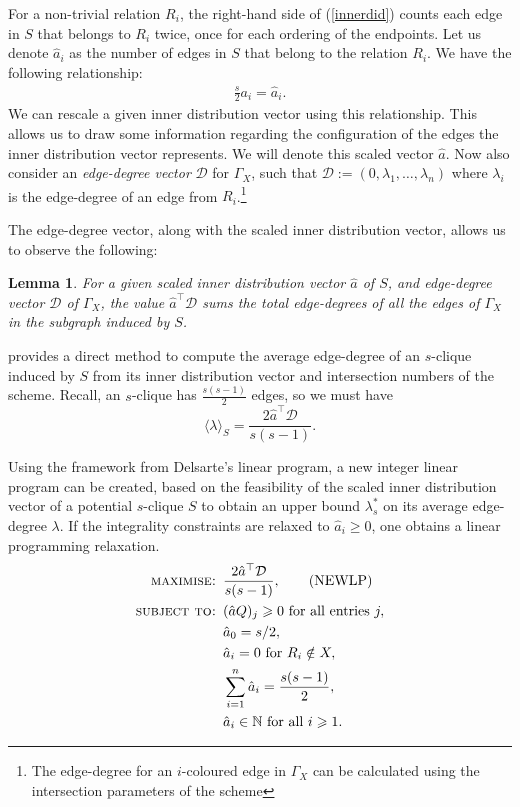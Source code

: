 \documentclass[11pt, baustms]{amsproc}
\theoremstyle{scplain}
\newtheorem{lemma}[theorem]{Lemma}
\renewcommand\ge{\geqslant}
\begin{document}
    For a non-trivial relation $R_i$, the right-hand side of (\ref{innerdid}) counts each edge in $S$ that belongs to $R_i$ twice, once for each ordering of the endpoints. Let us denote $\hat{a}_i$ as the number of edges in $S$ that belong to the relation $R_i$. We have the following relationship: \begin{align} \frac{s}{2} a_i = \hat{a}_i. \label{edgeconfig} \end{align} We can rescale a given inner distribution vector using this relationship. This allows us to draw some information regarding the configuration of the edges the inner distribution vector represents. We will denote this scaled vector $\hat{a}$. Now also consider an \textit{edge-degree vector} $\mathcal{D}$ for $\Gamma_X$,  such that $\mathcal{D} := (0, \lambda_1, \dots, \lambda_n)$ where $\lambda_i$ is the edge-degree of an edge from $R_i$.\footnote{The edge-degree for an $i$-coloured edge in $\Gamma_X$ can be calculated using the intersection parameters of the scheme}

    The edge-degree vector, along with the scaled inner distribution vector, allows us to observe the following:
	\begin{lemma}
		\label{eds}
		For a given scaled inner distribution vector $\hat{a}$ of $S$, and edge-degree vector $\mathcal{D}$ of $ \Gamma_X$, the value $\hat{a}^\top \mathcal{D}$ sums the total edge-degrees of all the edges of $\Gamma_X$ in the subgraph induced by $S$.
	\end{lemma}

	 provides a direct method to compute the average edge-degree of an $s$-clique induced by $S$ from its inner distribution vector and intersection numbers of the scheme. Recall, an $s$-clique has $\frac{s(s-1)}{2}$ edges, so we must have $$\langle \lambda \rangle_S = \frac{2 \hat{a}^\top \mathcal{D}}{s(s-1)}.$$ 


Using the framework from Delsarte's linear program, a new integer linear program can be created, based on the feasibility of the scaled inner distribution vector of a potential $s$-clique $S$ to obtain an upper bound $\lambda^*_s$ on its average edge-degree $\lambda$.  
If the integrality constraints are relaxed to \(\hat a_i\ge 0\), one obtains a linear programming relaxation.
		\begin{align*}
		\textsc{maximise: } & \frac{2 \hat{a}^\top \mathcal{D}}{s(s-1)}, \tag{NEWLP}\\
		\textsc{subject to: } & (\hat{a} Q)_j \ge 0 \textnormal{ for all entries } j, \\
		& \hat{a}_0 = s/2, \\
		& \hat{a}_i = 0 \textnormal{ for } R_i \notin X, \\
		& \sum_{i=1}^n \hat{a}_i = \frac{s(s-1)}{2}, \\
		& \hat{a}_i \in \mathbb{N} \textnormal{ for all } i \ge 1.
	\end{align*}
\end{document}

